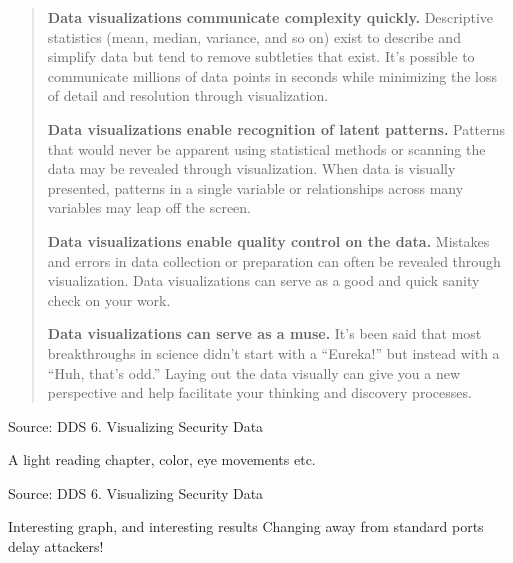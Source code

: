 \documentclass[Screen16to9,17pt]{foils}
\begin{document}
\begin{quote}
\begin{list2}\small
\item {\bf Data visualizations communicate complexity quickly.} Descriptive statistics (mean, median, variance, and so on) exist to describe and simplify data but tend to remove subtleties that exist. It’s possible to communicate millions of data points in seconds while minimizing the loss of detail and resolution through visualization.
\item {\bf Data visualizations enable recognition of latent patterns.} Patterns that would never be apparent using statistical methods or scanning the data may be revealed through visualization. When data is visually presented, patterns in a single variable or relationships across many variables may leap off the screen.
\item {\bf Data visualizations enable quality control on the data.} Mistakes and errors in data collection or preparation can often be revealed through visualization. Data visualizations can serve as a good and quick sanity check on your work.
\item {\bf Data visualizations can serve as a muse.} It’s been said that most breakthroughs in science didn’t start with a “Eureka!” but instead with a “Huh, that’s odd.” Laying out the data visually can give you a new perspective and help facilitate your thinking and discovery processes.
\end{list2}\end{quote}
Source: DDS 6. Visualizing Security Data

\begin{list2}
\item A light reading chapter, color, eye movements etc.
\end{list2}



Source: DDS 6. Visualizing Security Data

\begin{list2}
\item Interesting graph, and interesting results Changing away from standard ports delay attackers!
\end{list2}



\end{document}
